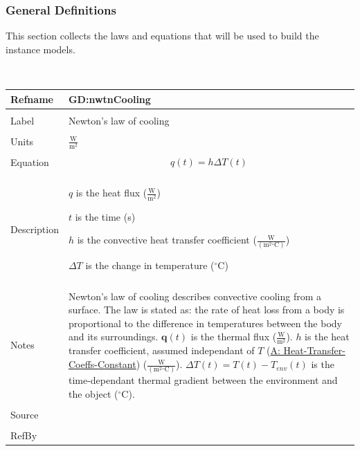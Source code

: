 \documentclass[12pt]{article}
\begin{document}
\subsubsection{General Definitions}
\label{Sec:GDs}
This section collects the laws and equations that will be used to build the instance models.
\par~

\noindent \begin{minipage}{\textwidth}
\begin{tabular}{>{\raggedright}p{}>{\raggedright\arraybackslash}p{}}
\toprule \textbf{Refname} & \textbf{GD:nwtnCooling}
\label{GD:nwtnCooling}
\\ \midrule \\
Label & Newton's law of cooling
\\ \midrule \\
Units & $\frac{\text{W}}{\text{m}^{2}}$
\\ \midrule \\
Equation & \begin{displaymath}
           q\left(t\right)=h ΔT\left(t\right)
           \end{displaymath}
\\ \midrule \\
Description & \begin{symbDescription}
              \item{$q$ is the heat flux ($\frac{\text{W}}{\text{m}^{2}}$)}
              \item{$t$ is the time (s)}
              \item{$h$ is the convective heat transfer coefficient ($\frac{\text{W}}{(\text{m}^{2}{}^{\circ}\text{C})}$)}
              \item{$ΔT$ is the change in temperature (${}^{\circ}$C)}
              \end{symbDescription}
\\ \midrule \\
Notes & Newton's law of cooling describes convective cooling from a surface. The law is stated as: the rate of heat loss from a body is proportional to the difference in temperatures between the body and its surroundings. $\mathbf{q}\left(t\right)$ is the thermal flux ($\frac{\text{W}}{\text{m}^{2}}$). $h$ is the heat transfer coefficient, assumed independant of $T$ (\hyperref[assumpHTCC]{A: Heat-Transfer-Coeffs-Constant}) ($\frac{\text{W}}{(\text{m}^{2}{}^{\circ}\text{C})}$). $ΔT\left(t\right)=T\left(t\right)-{T_{env}}\left(t\right)$ is the time-dependant thermal gradient between the environment and the object (${}^{\circ}$C).
\\ \midrule \\
Source & \cite[(pg. 8)]{incroperaEtAl2007}
\\ \midrule \\
RefBy & 
\\ \bottomrule
\end{tabular}
\end{minipage}
\par~
\end{document}
